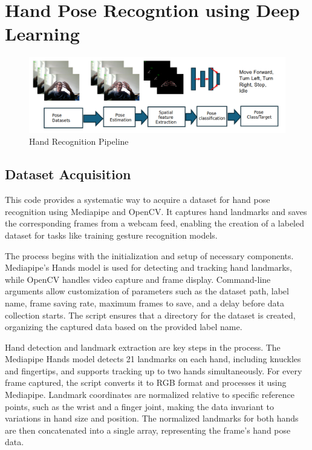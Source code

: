 
\chapter{Hand Pose Recogntion using Deep Learning}
\begin{figure}[h!]
	\centering
	\includegraphics[width=\linewidth]{img/pose_pipeline} %
	\caption{Hand Recognition Pipeline}
	\label{fig:pose_pipeline} %
\end{figure}

\section{Dataset Acquisition}
This code provides a systematic way to acquire a dataset for hand pose recognition using Mediapipe and OpenCV. It captures hand landmarks and saves the corresponding frames from a webcam feed, enabling the creation of a labeled dataset for tasks like training gesture recognition models.

The process begins with the initialization and setup of necessary components. Mediapipe's Hands model is used for detecting and tracking hand landmarks, while OpenCV handles video capture and frame display. Command-line arguments allow customization of parameters such as the dataset path, label name, frame saving rate, maximum frames to save, and a delay before data collection starts. The script ensures that a directory for the dataset is created, organizing the captured data based on the provided label name.

Hand detection and landmark extraction are key steps in the process. The Mediapipe Hands model detects 21 landmarks on each hand, including knuckles and fingertips, and supports tracking up to two hands simultaneously. For every frame captured, the script converts it to RGB format and processes it using Mediapipe. Landmark coordinates are normalized relative to specific reference points, such as the wrist and a finger joint, making the data invariant to variations in hand size and position. The normalized landmarks for both hands are then concatenated into a single array, representing the frame’s hand pose data.


